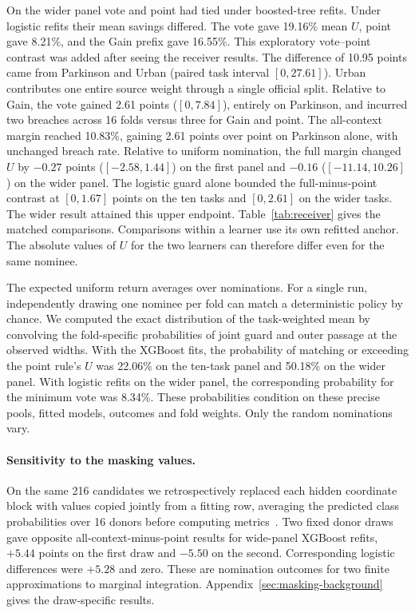 On the wider panel vote and point had tied under boosted-tree refits. Under logistic refits their mean savings differed. The vote gave 19.16\% mean $U$, point gave 8.21\%, and the Gain prefix gave 16.55\%. This exploratory vote--point contrast was added after seeing the receiver results. The difference of 10.95 points came from Parkinson and Urban (paired task interval $[0,27.61]$). Urban contributes one entire source weight through a single official split. Relative to Gain, the vote gained 2.61 points ($[0,7.84]$), entirely on Parkinson, and incurred two breaches across 16 folds versus three for Gain and point. The all-context margin reached 10.83\%, gaining 2.61 points over point on Parkinson alone, with unchanged breach rate. Relative to uniform nomination, the full margin changed $U$ by $-0.27$ points ($[-2.58,1.44]$) on the first panel and $-0.16$ ($[-11.14,10.26]$) on the wider panel. The logistic guard alone bounded the full-minus-point contrast at $[0,1.67]$ points on the ten tasks and $[0,2.61]$ on the wider tasks. The wider result attained this upper endpoint. Table~\ref{tab:receiver} gives the matched comparisons. Comparisons within a learner use its own refitted anchor. The absolute values of $U$ for the two learners can therefore differ even for the same nominee.

The expected uniform return averages over nominations. For a single run, independently drawing one nominee per fold can match a deterministic policy by chance. We computed the exact distribution of the task-weighted mean by convolving the fold-specific probabilities of joint guard and outer passage at the observed widths. With the XGBoost fits, the probability of matching or exceeding the point rule's $U$ was 22.06\% on the ten-task panel and 50.18\% on the wider panel. With logistic refits on the wider panel, the corresponding probability for the minimum vote was 8.34\%. These probabilities condition on these precise pools, fitted models, outcomes and fold weights. Only the random nominations vary.


\paragraph{Sensitivity to the masking values.}
On the same 216 candidates we retrospectively replaced each hidden coordinate block with values copied jointly from a fitting row, averaging the predicted class probabilities over 16 donors before computing metrics~\cite{covert2020sage,covert2021removing}. Two fixed donor draws gave opposite all-context-minus-point results for wide-panel XGBoost refits, $+5.44$ points on the first draw and $-5.50$ on the second. Corresponding logistic differences were $+5.28$ and zero. These are nomination outcomes for two finite approximations to marginal integration. Appendix~\ref{sec:masking-background} gives the draw-specific results.

